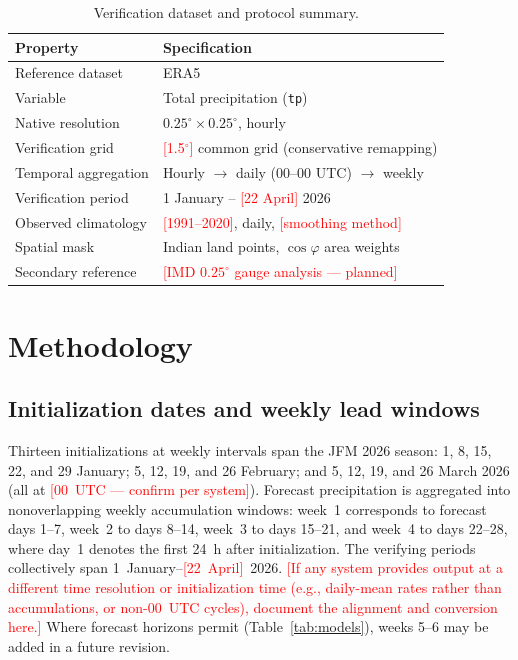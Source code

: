 \documentclass[11pt]{article}
\newcommand{\ph}[1]{\textcolor{red}{[#1]}}
\begin{document}
\begin{table}[t]
  \caption{Verification dataset and protocol summary.}
  \label{tab:verif}
  \centering
  \small
  \begin{tabular}{ll}
    \toprule
    Property & Specification \\
    \midrule
    Reference dataset        & ERA5 \citep{hersbach2020} \\
    Variable                 & Total precipitation (\texttt{tp}) \\
    Native resolution        & $0.25^{\circ}\times0.25^{\circ}$, hourly \\
    Verification grid        & \ph{1.5$^{\circ}$} common grid (conservative remapping) \\
    Temporal aggregation     & Hourly $\rightarrow$ daily (00--00 UTC) $\rightarrow$ weekly \\
    Verification period      & 1 January -- \ph{22 April} 2026 \\
    Observed climatology     & \ph{1991--2020}, daily, \ph{smoothing method} \\
    Spatial mask             & Indian land points, $\cos\varphi$ area weights \\
    Secondary reference      & \ph{IMD $0.25^{\circ}$ gauge analysis \citep{pai2014} --- planned} \\
    \bottomrule
  \end{tabular}
\end{table}

\section{Methodology}\label{sec:method}

\subsection{Initialization dates and weekly lead windows}\label{sec:weeks}

Thirteen initializations at weekly intervals span the JFM 2026 season:
1, 8, 15, 22, and 29 January; 5, 12, 19, and 26 February; and 5, 12,
19, and 26 March 2026 (all at \ph{00~UTC --- confirm per system}).
Forecast precipitation is aggregated into nonoverlapping weekly
accumulation windows: week~1 corresponds to forecast days 1--7, week~2
to days 8--14, week~3 to days 15--21, and week~4 to days 22--28, where
day~1 denotes the first 24~h after initialization. The verifying
periods collectively span 1~January--\ph{22~April}~2026. \ph{If any
system provides output at a different time resolution or
initialization time (e.g., daily-mean rates rather than accumulations,
or non-00~UTC cycles), document the alignment and conversion here.}
Where forecast horizons permit (Table~\ref{tab:models}), weeks 5--6 may
be added in a future revision.
\end{document}
